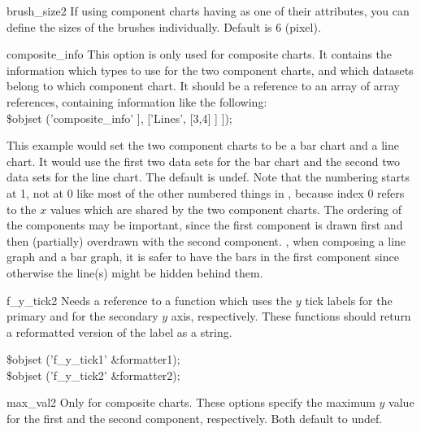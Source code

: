 \constructorblurb{\thisname}

\begin{AttrDecl}{brush\_size2}
If using component charts having  as one of their
attributes, you can define the sizes of the brushes individually.
Default is 6 (pixel).
\end{AttrDecl}

\begin{AttrDecl}{composite\_info}
This option is only used for composite charts. It contains the
information which types to use for the two component charts, and which
datasets belong to which component chart. It should be a reference to an
array of array references, containing information like the following:\\
\$obj\deref set ('composite\_info' \fatcomma [ ['Bars', [1,2]], ['Lines', [3,4] ] ]);

This example would set the two component charts to be a bar chart and a
line chart. It would use the first two data sets for the bar chart and
the second two data sets for the line chart. The default is undef. Note
that the numbering starts at 1, not at 0 like most of the other numbered
things in , because index 0 refers to the $x$ values which
are shared by the two component charts. The ordering of the components
may be important, since the first component is drawn first and then
(partially) overdrawn with the second component. \Eg, when composing a
line graph and a bar graph, it is safer to have the bars in the first
component since otherwise the line(s) might be hidden behind them.
\end{AttrDecl}

\begin{AttrDecl}{f\_y\_tick2}
Needs a reference to a function which uses the $y$ tick labels for the
primary and for the secondary $y$ axis, respectively. These functions
should return a reformatted version of the label as a string. \Eg
\begin{SmallExample}
\$obj\deref set ('f\_y\_tick1' \fatcomma \bs\&formatter1);\\
\$obj\deref set ('f\_y\_tick2' \fatcomma \bs\&formatter2);
\end{SmallExample}
\end{AttrDecl}

\begin{AttrDecl}{max\_val2}
Only for composite charts. These options specify the maximum $y$ value
for the first and the second component, respectively. Both default to
undef.
\end{AttrDecl}

